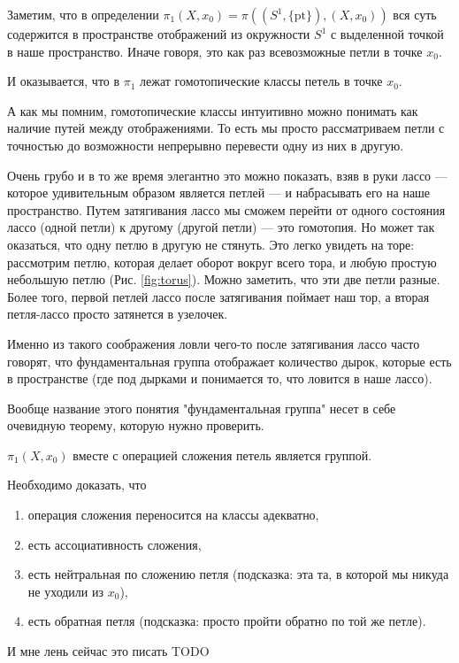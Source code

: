 \begin{Note}
    Заметим, что в определении $\pi_1(X, x_0) = \pi((S^1, \{\mathrm{pt}\}),(X, x_0))$ вся суть содержится в пространстве отображений из окружности $S^1$ с выделенной точкой в наше пространство. Иначе говоря, это как раз всевозможные петли в точке $x_0$. 

    И оказывается, что в $\pi_1$ лежат гомотопические классы петель в точке $x_0$.

    А как мы помним, гомотопические классы интуитивно можно понимать как наличие путей между отображениями. То есть мы просто рассматриваем петли с точностью до возможности непрерывно перевести одну из них в другую.

    Очень грубо и в то же время элегантно это можно показать, взяв в руки лассо --- которое удивительным образом является петлей --- и набрасывать его на наше пространство. Путем затягивания лассо мы сможем перейти от одного состояния лассо (одной петли) к другому (другой петли) --- это гомотопия. Но может так оказаться, что одну петлю в другую не стянуть. Это легко увидеть на торе: рассмотрим петлю, которая делает оборот вокруг всего тора, и любую простую небольшую петлю (Рис. \ref{fig:torus}). Можно заметить, что эти две петли разные. Более того, первой петлей лассо после затягивания поймает наш тор, а  вторая петля-лассо просто затянется в узелочек.

    Именно из такого соображения ловли чего-то после затягивания лассо часто говорят, что фундаментальная группа отображает количество дырок, которые есть в пространстве (где под дырками и понимается то, что ловится в наше лассо).
\end{Note}

Вообще название этого понятия "фундаментальная группа" несет в себе очевидную теорему, которую нужно проверить.
\begin{Th}
    $\pi_1(X,x_0)$ вместе с операцией сложения петель является группой.
\end{Th}
\begin{Proof}
    Необходимо доказать, что 
    \begin{enumerate}
        \item операция сложения переносится на классы адекватно,
        \item есть ассоциативность сложения,
        \item есть нейтральная по сложению петля (подсказка: эта та, в которой мы никуда не уходили из $x_0$),
        \item есть обратная петля (подсказка: просто пройти обратно по той же петле).
    \end{enumerate}

    И мне лень сейчас это писать TODO
\end{Proof}

